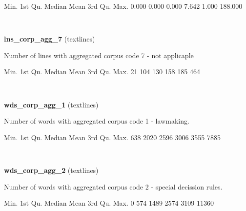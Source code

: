 \documentclass[]{article}
\newenvironment{Shaded}{\begin{snugshade}}{\end{snugshade}}
\newcommand{\DecValTok}[1]{\textcolor[rgb]{0.00,0.00,0.81}{{#1}}}
\newcommand{\FloatTok}[1]{\textcolor[rgb]{0.00,0.00,0.81}{{#1}}}
\newcommand{\NormalTok}[1]{{#1}}
\begin{document}
\begin{Shaded}
\begin{Highlighting}[]
   \NormalTok{Min. 1st Qu.  Median    Mean 3rd Qu.    Max. }
  \FloatTok{0.000}   \FloatTok{0.000}   \FloatTok{0.000}   \FloatTok{7.642}   \FloatTok{1.000} \FloatTok{188.000} 
\end{Highlighting}
\end{Shaded}

~

\vspace{1em}

\textbf{lns\_corp\_agg\_7} (textlines)

Number of lines with aggregated corpus code 7 - not applicaple

\begin{Shaded}
\begin{Highlighting}[]
   \NormalTok{Min. 1st Qu.  Median    Mean 3rd Qu.    Max. }
     \DecValTok{21}     \DecValTok{104}     \DecValTok{130}     \DecValTok{158}     \DecValTok{185}     \DecValTok{464} 
\end{Highlighting}
\end{Shaded}

~

\vspace{1em}

\textbf{wds\_corp\_agg\_1} (textlines)

Number of words with aggregated corpus code 1 - lawmaking.

\begin{Shaded}
\begin{Highlighting}[]
   \NormalTok{Min. 1st Qu.  Median    Mean 3rd Qu.    Max. }
    \DecValTok{638}    \DecValTok{2020}    \DecValTok{2596}    \DecValTok{3006}    \DecValTok{3555}    \DecValTok{7885} 
\end{Highlighting}
\end{Shaded}

~

\vspace{1em}

\textbf{wds\_corp\_agg\_2} (textlines)

Number of words with aggregated corpus code 2 - special decission rules.

\begin{Shaded}
\begin{Highlighting}[]
   \NormalTok{Min. 1st Qu.  Median    Mean 3rd Qu.    Max. }
      \DecValTok{0}     \DecValTok{574}    \DecValTok{1489}    \DecValTok{2574}    \DecValTok{3109}   \DecValTok{11360} 
\end{Highlighting}
\end{Shaded}
\end{document}
